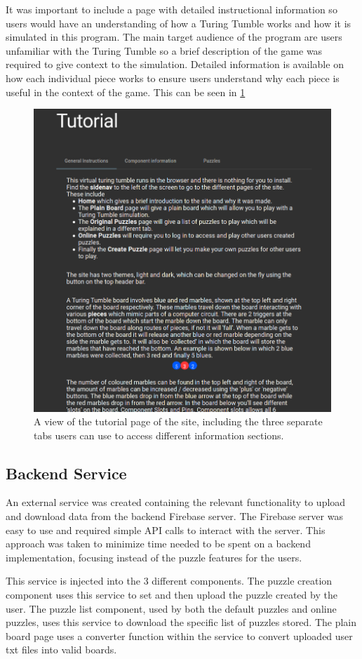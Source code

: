 \documentclass{l4proj}
\begin{document}
It was important to include a page with detailed instructional information so users would have an understanding of how a Turing Tumble works and how it is simulated in this program. The main target audience of the program are users unfamiliar with the Turing Tumble so a brief description of the game was required to give context to the simulation. Detailed information is available on how each individual piece works to ensure users understand why each piece is useful in the context of the game. This can be seen in \ref{fig:tutorial}

\begin{figure}
    \centering
    \includegraphics[width=0.7\linewidth]{images/tutorial.png}
    \caption{A view of the tutorial page of the site, including the three separate tabs users can use to access different information sections.}
    \label{fig:tutorial}
\end{figure}



\subsection{Backend Service}
An external service was created containing the relevant functionality to upload and download data from the backend Firebase server. The Firebase server was easy to use and required simple API calls to interact with the server. This approach was taken to minimize time needed to be spent on a backend implementation, focusing instead of the puzzle features for the users. 

This service is injected into the 3 different components. The puzzle creation component uses this service to set and then upload the puzzle created by the user. The puzzle list component, used by both the default puzzles and online puzzles, uses this service to download the specific list of puzzles stored. The plain board page uses a converter function within the service to convert uploaded user txt files into valid boards.
\end{document}

